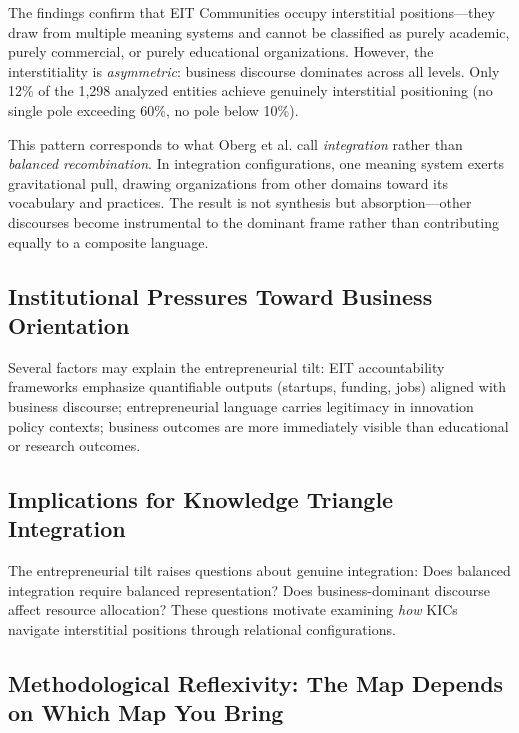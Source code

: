 \documentclass[../main.tex]{subfiles}
\begin{document}
The findings confirm that EIT Communities occupy interstitial positions---they draw from multiple meaning systems and cannot be classified as purely academic, purely commercial, or purely educational organizations. However, the interstitiality is \textit{asymmetric}: business discourse dominates across all levels. Only 12\% of the 1,298 analyzed entities achieve genuinely interstitial positioning (no single pole exceeding 60\%, no pole below 10\%).

This pattern corresponds to what Oberg et al. \citeyear{oberg2017culture} call \textit{integration} rather than \textit{balanced recombination}. In integration configurations, one meaning system exerts gravitational pull, drawing organizations from other domains toward its vocabulary and practices. The result is not synthesis but absorption---other discourses become instrumental to the dominant frame rather than contributing equally to a composite language.

\subsection{Institutional Pressures Toward Business Orientation}

Several factors may explain the entrepreneurial tilt: EIT accountability frameworks emphasize quantifiable outputs (startups, funding, jobs) aligned with business discourse; entrepreneurial language carries legitimacy in innovation policy contexts; business outcomes are more immediately visible than educational or research outcomes.

\subsection{Implications for Knowledge Triangle Integration}

The entrepreneurial tilt raises questions about genuine integration: Does balanced integration require balanced representation? Does business-dominant discourse affect resource allocation? These questions motivate examining \textit{how} KICs navigate interstitial positions through relational configurations.

\subsection{Methodological Reflexivity: The Map Depends on Which Map You Bring}
\label{subsec:interstitial:method-reflexivity}
\end{document}
